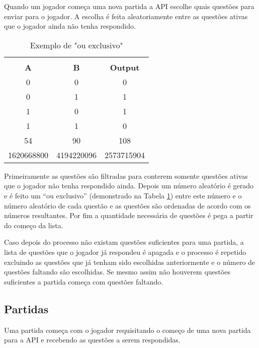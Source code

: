 Quando um jogador começa uma nova partida a API escolhe quais questões para enviar para o jogador. A escolha é feita aleatoriamente entre as questões ativas que o jogador ainda não tenha respondido. 

\begin{table}[]
\caption{\label{table:xorExemple} Exemplo de "ou exclusivo"}
\centering
\begin{tabular}{|c|c|c|l|}
\hline
\rowcolor[HTML]{C0C0C0} 
\multicolumn{2}{|c|}{\cellcolor[HTML]{C0C0C0}\textbf{Input}} & \multicolumn{2}{c|}{\cellcolor[HTML]{C0C0C0}} \\ \cline{1-2}
\rowcolor[HTML]{C0C0C0} 
\textbf{A} & \textbf{B} & \multicolumn{2}{c|}{\multirow{-2}{*}{\cellcolor[HTML]{C0C0C0}\textbf{Output}}} \\ \hline
0 & 0 & \multicolumn{2}{c|}{0} \\ \hline
0 & 1 & \multicolumn{2}{c|}{1} \\ \hline
1 & 0 & \multicolumn{2}{c|}{1} \\ \hline
1 & 1 & \multicolumn{2}{c|}{0} \\ \hline
54 & 90 & \multicolumn{2}{c|}{108} \\ \hline
1620668800 & 4194220096 & \multicolumn{2}{c|}{2573715904} \\ \hline
\end{tabular}
\end{table}

Primeiramente as questões são filtradas para conterem somente questões ativas que o jogador não tenha respondido ainda. Depois um número aleatório é gerado e é feito um “ou exclusivo” (demonstrado na Tabela \ref{table:xorExemple}) entre este número e o número aleatório de cada questão e as questões são ordenadas de acordo com os números resultantes. Por fim a quantidade necessária de questões é pega a partir do começo da lista.

Caso depois do processo não existam questões suficientes para uma partida, a lista de questões que o jogador já respondeu é apagada e o processo é repetido excluindo as questões que já tenham sido escolhidas anteriormente e o número de questões faltando são escolhidas. Se mesmo assim não houverem questões suficientes a partida começa com questões faltando.

\subsection{Partidas}
\label{subsec:partidas}

Uma partida começa com o jogador requisitando o começo de uma nova partida para a API e recebendo as questões a serem respondidas. 

